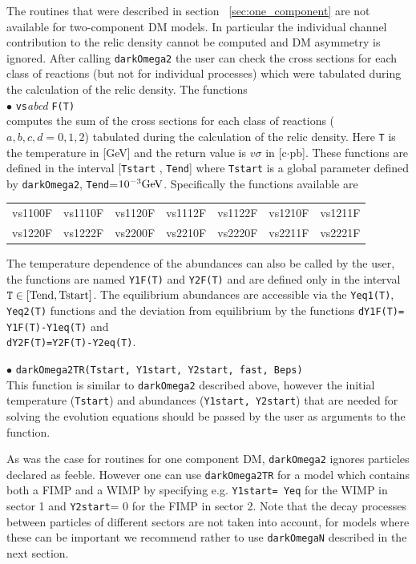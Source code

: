 \documentclass[12pt,a4paper]{article}
\begin{document}
The routines that were described in section ~\ref{sec:one_component} are not available for two-component DM models. In particular the individual channel contribution to the relic density cannot be computed and DM asymmetry is ignored. 
 After calling  {\tt  darkOmega2}  the user can check the  cross sections  
for each class of reactions (but not for individual processes) which were tabulated during the calculation of the relic density. 
The functions\\
$\bullet$ \verb|vs|{\it abcd} \verb|F(T)|\\
computes the sum of  the cross sections  
for each class of reactions ($a,b,c,d=0,1,2$) tabulated during the calculation of the relic density. 
Here  \verb|T| is the temperature in [GeV] and the 
return value is $v\sigma$ in [c$\cdot$pb].  These functions are defined in the interval [{\tt Tstart} , {\tt Tend}] where
{\tt Tstart} is a global parameter defined by \verb|darkOmega2|, {\tt Tend}=$10^{-3}{\rm GeV}$. Specifically the functions available are

\begin{center}
\begin{tabular}{ l l l l l l l }
vs1100F & vs1110F & vs1120F&vs1112F&vs1122F&vs1210F&vs1211F\\
vs1220F&vs1222F&vs2200F&vs2210F&vs2220F&vs2211F& vs2221F
\end{tabular}
\end{center} 

The  temperature dependence  of the abundances can also be called by the user, the functions are named {\tt Y1F(T)} and {\tt Y2F(T)} and are defined only in the  interval ${\tt T}\in
[\rm{Tend},\rm{Tstart}]$. The equilibrium abundances are accessible via  the  { \tt Yeq1(T)}, { \tt Yeq2(T)} functions and the deviation from equilibrium  
by the functions
 {\tt dY1F(T)= Y1F(T)-Y1eq(T)}  and \\
   { \tt dY2F(T)=Y2F(T)-Y2eq(T)}.

\noindent
$\bullet$ \verb|darkOmega2TR(Tstart, Y1start, Y2start, fast, Beps)|\\
This function is similar to \verb|darkOmega2| described above, however the initial temperature (\verb|Tstart|) and abundances (\verb|Y1start, Y2start|) that are needed for solving the evolution equations should be  passed by the user as arguments to the function. 


As was the case for routines for  one  component DM, {\tt darkOmega2}  ignores particles declared as feeble. However one can use \verb|darkOmega2TR| for a model which contains both a FIMP and a WIMP by  specifying e.g. {\tt Y1start= Yeq} for the WIMP in sector 1 and {\tt Y2start}= 0 for the  FIMP in sector 2. Note that the decay processes between particles of different sectors are not taken into account,  for  models where these can be important we recommend rather to use \verb|darkOmegaN| described in the next section.
 
\end{document}
